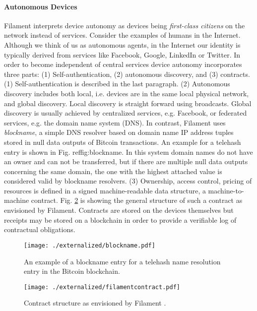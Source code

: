 \paragraph{Autonomous Devices}
Filament interprets device autonomy as devices being \emph{first-class citizens} on the network instead of services. Consider the examples of humans in the Internet. Although we think of us as autonomous agents, in the Internet our identity is typically derived from services like Facebook, Google, LinkedIn or Twitter. In order to become independent of central services device autonomy incorporates three parts: (1) Self-authentication, (2) autonomous discovery, and (3) contracts. (1) Self-authentication is described in the last paragraph. (2) Autonomous discovery includes both local, i.e. devices are in the same local physical network, and global discovery.
Local discovery is straight forward using broadcasts. Global discovery is usually achieved by centralized services, e.g. Facebook, or federated services, e.g. the domain name system (DNS). In contrast, Filament uses \emph{blockname}, a simple DNS resolver based on domain name IP address tuples stored in null data outputs of Bitcoin transactions. An example for a telehash entry is shown in Fig. ref{fig:blockname}. In this system domain names do not have an owner and can not be transferred, but if there are multiple null data outputs concerning the same domain, the one with the highest attached value is considered valid by blockname resolvers. (3) Ownership, access control, pricing of resources is defined in a signed machine-readable data structure, a machine-to-machine contract. Fig. \ref{fig:filament} is showing the general structure of such a contract as envisioned by Filament. Contracts are stored on the devices themselves but receipts may be stored on a blockchain in order to provide a verifiable log of contractual obligations.

\begin{figure}
\centering
\texttt{[image: ./externalized/blockname.pdf]}
\caption{An example of a blockname entry for a telehash name resolution entry in the Bitcoin blockchain.}
\label{fig:blockname}
\end{figure}


\begin{figure}
\centering
\texttt{[image: ./externalized/filamentcontract.pdf]}
\caption{Contract structure as envisioned by Filament \cite{filament}.}
\label{fig:filament}
\end{figure}

